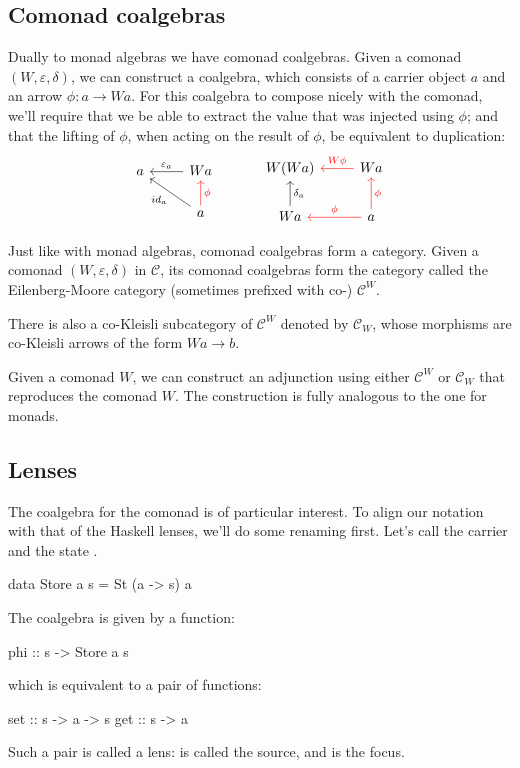 \documentclass[DaoFP]{subfiles}
\begin{document}
\subsection{Comonad coalgebras}

Dually to monad algebras we have comonad coalgebras. Given a comonad $(W, \varepsilon, \delta)$, we can construct a coalgebra, which consists of a carrier object $a$ and an arrow $\phi \colon a \to W a$. For this coalgebra to compose nicely with the comonad, we'll require that we be able to extract the value that was injected using $\phi$; and that the lifting of $\phi$, when acting on the result of $\phi$, be equivalent to duplication:
\[
 \begin{tikzcd}
 a
 & W a
 \arrow[l, "\varepsilon_a"']
 \\
 & a
 \arrow[ul, "id_a"]
\arrow[u, red, "\phi"']
 \end{tikzcd}
  \hspace{30pt}
 \begin{tikzcd}
W(W a) 
&W a
\arrow[l, red, "W \phi "']
\\
W a
\arrow[u, "\delta_a"']
& a
\arrow[l, red, "\phi"']
\arrow[u, red, "\phi"']
 \end{tikzcd}
\]

Just like with monad algebras, comonad coalgebras form a category. Given a comonad $(W, \varepsilon, \delta)$ in $\mathcal{C}$, its comonad coalgebras form the category called the Eilenberg-Moore category (sometimes prefixed with co-) $\mathcal{C}^W$.

There is also a co-Kleisli subcategory of $\mathcal{C}^W$ denoted by $\mathcal{C}_W$, whose morphisms are co-Kleisli arrows of the form $W a \to b$.

Given a comonad $W$, we can construct an adjunction using either $\mathcal{C}^W$ or $\mathcal{C}_W$ that reproduces the comonad $W$. The construction is fully analogous to the one for monads.

\subsection{Lenses}

The coalgebra for the  comonad is of particular interest. To align our notation with that of the Haskell lenses, we'll do some renaming first. Let's call the carrier  and the state . 
\begin{haskell}
data Store a s = St (a -> s) a
\end{haskell}
The coalgebra is given by a function:
\begin{haskell}
phi :: s -> Store a s
\end{haskell}
which is equivalent to a pair of functions:
\begin{haskell}
set :: s -> a -> s
get :: s -> a
\end{haskell}
Such a pair is called a lens:  is called the source, and  is the focus. 
\end{document}
